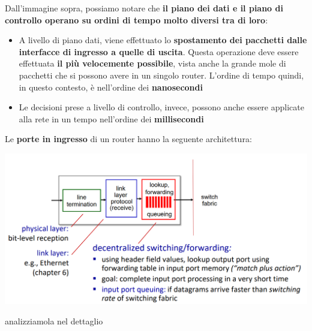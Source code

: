 \documentclass[12pt]{article}
\begin{document}
Dall'immagine sopra, possiamo notare che \textbf{il piano dei dati e il piano di controllo operano su ordini di tempo molto diversi tra di loro}:
\begin{itemize}
    \item A livello di piano dati, viene effettuato lo \textbf{spostamento dei pacchetti dalle interfacce di ingresso a quelle di uscita}. Questa operazione deve essere effettuata \textbf{il più velocemente possibile}, vista anche la grande mole di pacchetti
    che si possono avere in un singolo router. L'ordine di tempo quindi, in questo contesto, è nell'ordine dei \textbf{nanosecondi}
    \item Le decisioni prese a livello di controllo, invece, possono anche essere applicate alla rete in un tempo nell'ordine dei \textbf{millisecondi}
\end{itemize}
Le \textbf{porte in ingresso} di un router hanno la seguente architettura:
\begin{center}
    \includegraphics[width = 1\linewidth]{Images/78.png}
\end{center}
analizziamola nel dettaglio
\end{document}
